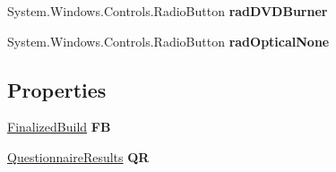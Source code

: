 \begin{DoxyCompactItemize}
\item 
System.\+Windows.\+Controls.\+Radio\+Button {\bfseries rad\+D\+V\+D\+Burner}\hypertarget{class_p_c_builder_forms_1_1_questionnaire_a4dbb291702e5c164203150799da2d179}{}\label{class_p_c_builder_forms_1_1_questionnaire_a4dbb291702e5c164203150799da2d179}

\item 
System.\+Windows.\+Controls.\+Radio\+Button {\bfseries rad\+Optical\+None}\hypertarget{class_p_c_builder_forms_1_1_questionnaire_a042a2900dee726caecea62754540e6a6}{}\label{class_p_c_builder_forms_1_1_questionnaire_a042a2900dee726caecea62754540e6a6}

\end{DoxyCompactItemize}
\subsection*{Properties}
\begin{DoxyCompactItemize}
\item 
\hyperlink{class_business_objects_1_1_finalized_build}{Finalized\+Build} {\bfseries FB}\hypertarget{class_p_c_builder_forms_1_1_questionnaire_afa53e86f988e8542c4355b18b4d61382}{}\label{class_p_c_builder_forms_1_1_questionnaire_afa53e86f988e8542c4355b18b4d61382}

\item 
\hyperlink{class_business_objects_1_1_questionnaire_results}{Questionnaire\+Results} {\bfseries QR}\hypertarget{class_p_c_builder_forms_1_1_questionnaire_ac4a23f37f67fd6346138c0a480434dad}{}\label{class_p_c_builder_forms_1_1_questionnaire_ac4a23f37f67fd6346138c0a480434dad}

\end{DoxyCompactItemize}
